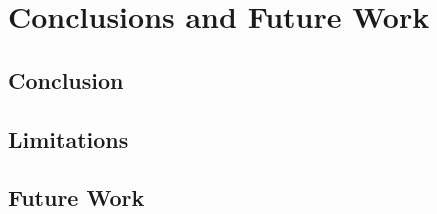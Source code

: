 \chapter{Conclusions and Future Work}
\label{ch:conclusion}

\section{Conclusion}

\section{Limitations}

\section{Future Work}
